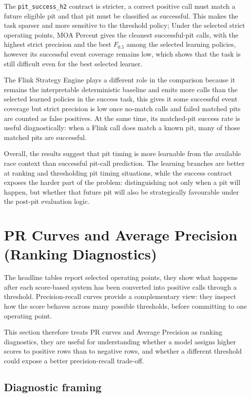 The \texttt{pit\_success\_h2} contract is stricter, a correct positive call must match a future eligible pit and that pit must be classified as successful.
This makes the task sparser and more sensitive to the threshold policy; Under the selected strict operating points, MOA Percent gives the cleanest successful-pit
calls, with the highest strict precision and the best $F_{0.5}$ among the selected learning policies, however its successful event coverage remains low, which
shows that the task is still difficult even for the best selected learner.

The Flink Strategy Engine plays a different role in the comparison because it remains the interpretable deterministic baseline and emits more calls than the selected
learned policies in the success task, this gives it some successful event coverage but strict precision is low once no-match calls and failed matched pits are
counted as false positives. At the same time, its matched-pit success rate is useful diagnostically: when a Flink call does match a known pit, many of those
matched pits are successful.

Overall, the results suggest that pit timing is more learnable from the available race context than successful pit-call prediction. The learning branches are
better at ranking and thresholding pit timing situations, while the success contract exposes the harder part of the problem: distinguishing not only when a pit
will happen, but whether that future pit will also be strategically favourable under the post-pit evaluation logic.

\section{PR Curves and Average Precision (Ranking Diagnostics)}

The headline tables report selected operating points, they show what happens after each score-based system has been converted into positive calls through a threshold.
Precision-recall curves provide a complementary view: they inspect how the score behaves across many possible thresholds, before committing to one operating point.

This section therefore treats PR curves and Average Precision as ranking diagnostics, they are useful for understanding whether a model assigns higher scores to positive
rows than to negative rows, and whether a different threshold could expose a better precision-recall trade-off.

\subsection{Diagnostic framing}

